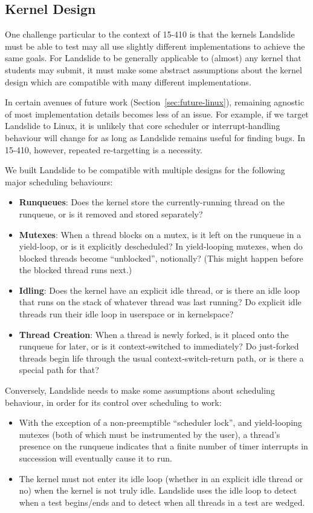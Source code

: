 \subsection{Kernel Design}

One challenge particular to the context of 15-410 is that the kernels Landslide must be able to test may all use slightly different implementations to achieve the same goals. For Landslide to be generally applicable to (almost) any kernel that students may submit, it must make some abstract assumptions about the kernel design which are compatible with many different implementations.

In certain avenues of future work (Section~\ref{sec:future-linux}), remaining agnostic of most implementation details becomes less of an issue. For example, if we target Landslide to Linux, it is unlikely that core scheduler or interrupt-handling behaviour will change for as long as Landslide remains useful for finding bugs. In 15-410, however, repeated re-targetting is a necessity.

We built Landslide to be compatible with multiple designs for the following major scheduling behaviours:

\begin{itemize}
	\item {\bf Runqueues}: Does the kernel store the currently-running thread on the runqueue, or is it removed and stored separately?
	\item {\bf Mutexes}: When a thread blocks on a mutex, is it left on the runqueue in a yield-loop, or is it explicitly descheduled? In yield-looping mutexes, when do blocked threads become ``unblocked'', notionally? (This might happen before the blocked thread runs next.)
	\item {\bf Idling}: Does the kernel have an explicit idle thread, or is there an idle loop that runs on the stack of whatever thread was last running? Do explicit idle threads run their idle loop in userspace or in kernelspace?
	\item {\bf Thread Creation}: When a thread is newly forked, is it placed onto the runqueue for later, or is it context-switched to immediately? Do just-forked threads begin life through the usual context-switch-return path, or is there a special path for that?
\end{itemize}

Conversely, Landslide needs to make some assumptions about scheduling behaviour, in order for its control over scheduling to work:

\begin{itemize}
	\item With the exception of a non-preemptible ``scheduler lock'', and yield-looping mutexes (both of which must be instrumented by the user), a thread's presence on the runqueue indicates that a finite number of timer interrupts in succession will eventually cause it to run.
	\item The kernel must not enter its idle loop (whether in an explicit idle thread or no) when the kernel is not truly idle. Landslide uses the idle loop to detect when a test begins/ends and to detect when all threads in a test are wedged.
\end{itemize}
